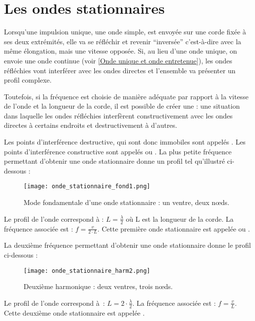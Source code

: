 \chapter{Les ondes stationnaires}
Lorsqu'une impulsion unique, une onde simple, est envoyée sur une corde fixée à ses deux extrémités, elle va se réfléchir et revenir \enquote{inversée} c'est-à-dire avec la même élongation, mais une vitesse opposée. Si, au lieu d'une onde unique, on envoie une onde continue (voir \ref{Onde unique et onde entretenue}), les ondes réfléchies vont interférer avec les ondes directes et l'ensemble va présenter un profil complexe.

Toutefois, si la fréquence est choisie de manière adéquate par rapport à la vitesse de l'onde et la longueur de la corde, il est possible de créer une  : une situation dans laquelle les ondes réfléchies interfèrent constructivement avec les ondes directes à certains endroits et destructivement à d'autres.


Les points d'interférence destructive, qui sont donc immobiles sont appelés . Les points d'interférence constructive sont appelés  ou .
La plus petite fréquence permettant d'obtenir une onde stationnaire donne un profil tel qu'illustré ci-dessous :

\begin{figure}[ht!]
    \centering
    \texttt{[image: onde\_stationnaire\_fond1.png]}
    \caption{Mode fondamentale d'une onde stationnaire : un ventre, deux n\oe{}ds.}
\end{figure}

Le profil de l'onde correspond à : \(L=\frac{\lambda}{2}\) où L est la longueur de la corde. La fréquence associée est : \(f=\frac{v}{2 \cdot L}\). Cette première onde stationnaire est appelée  ou .

La deuxième fréquence permettant d'obtenir une onde stationnaire donne le profil ci-dessous :
\begin{figure}[ht!]
    \centering
    \texttt{[image: onde\_stationnaire\_harm2.png]}
    \caption{Deuxième harmonique : deux ventres, trois n\oe{}ds.}
\end{figure}

Le profil de l'onde correspond à : \(L=2 \cdot \frac{\lambda}{2}\). La fréquence associée est : \(f=\frac{v}{ L}\). Cette deuxième onde stationnaire est appelée .

